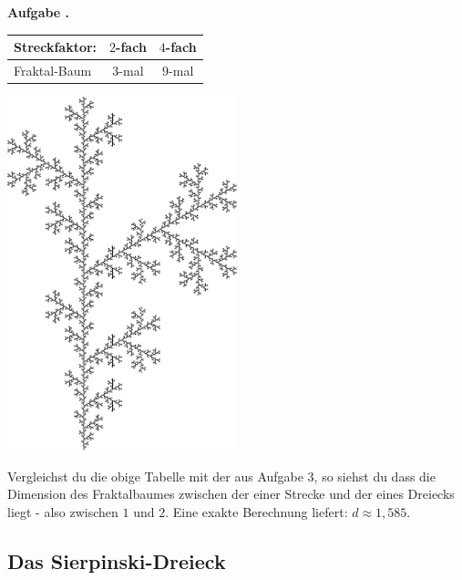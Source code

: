 \documentclass[a4paper,ngerman,12pt]{scrartcl}
\theoremstyle{definition}
\theoremstyle{plain}
\theoremstyle{remark}
\newlength{\aufgabenskip}
\newcounter{aufgabennummer}
\newenvironment{aufgabe}[1]{
  \addtocounter{aufgabennummer}{1}
  \textbf{Aufgabe \theaufgabennummer.} \emph{#1} \par
}{\vspace{\aufgabenskip}}
\begin{document}
\begin{aufgabe}{}
	\begin{minipage}{\textwidth}
		\begin{minipage}[t]{0.7\textwidth}
			\renewcommand{\arraystretch}{2}
			\begin{center}
				\begin{tabular}{l||c|c}
				Streckfaktor:& $2$-fach & $4$-fach \\\hline\hline
				Fraktal-Baum & $3$-mal & $9$-mal \\	
			\end{tabular}
			\end{center}
		\end{minipage}
		\begin{minipage}[t]{0.2\textwidth}\vspace{-1.5cm}
			\includegraphics[width=0.5\textwidth]{Bilder/Baum.pdf}
		\end{minipage}
	\end{minipage}
	
	Vergleichst du die obige Tabelle mit der aus Aufgabe 3, so siehst du dass die Dimension des Fraktalbaumes zwischen der einer Strecke und der eines Dreiecks liegt - also zwischen $1$ und $2$. Eine exakte Berechnung liefert: $d \approx 1,585$.
\end{aufgabe}


\subsection{Das Sierpinski-Dreieck}
\end{document}
